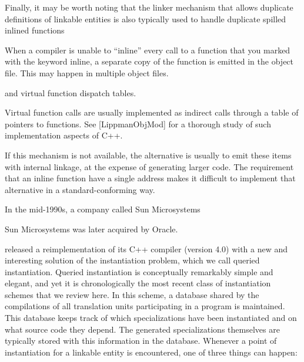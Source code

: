 Finally, it may be worth noting that the linker mechanism that allows duplicate definitions of linkable entities is also typically used to handle duplicate spilled inlined functions

\begin{tcolorbox}[colback=webgreen!5!white,colframe=webgreen!75!black]
\hspace*{0.75cm}When a compiler is unable to “inline” every call to a function that you marked with the keyword inline, a separate copy of the function is emitted in the object file. This may happen in multiple object files.
\end{tcolorbox}

and virtual function dispatch tables.

\begin{tcolorbox}[colback=webgreen!5!white,colframe=webgreen!75!black]
\hspace*{0.75cm}Virtual function calls are usually implemented as indirect calls through a table of pointers to functions. See [LippmanObjMod] for a thorough study of such implementation aspects of C++.
\end{tcolorbox}

If this mechanism is not available, the alternative is usually to emit these items with internal linkage, at the expense of generating larger code. The requirement that an inline function have a single address makes it difficult to implement that alternative in a standard-conforming way.


In the mid-1990s, a company called Sun Microsystems

\begin{tcolorbox}[colback=webgreen!5!white,colframe=webgreen!75!black]
\hspace*{0.75cm}Sun Microsystems was later acquired by Oracle.
\end{tcolorbox}

released a reimplementation of its C++ compiler (version 4.0) with a new and interesting solution of the instantiation problem, which we call queried instantiation. Queried instantiation is conceptually remarkably simple and elegant, and yet it is chronologically the most recent class of instantiation schemes that we review here. In this scheme, a database shared by the compilations of all translation units participating in a program is maintained. This database keeps track of which specializations have been instantiated and on what source code they depend. The generated specializations themselves are typically stored with this information in the database. Whenever a point of instantiation for a linkable entity is encountered, one of three things can happen:

